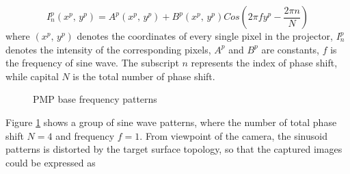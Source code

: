  \begin{equation}
%
I^p_n(x^p, \, y^p) %
= A^p(x^p, \, y^p) + B^p(x^p, \, y^p)Cos(2\pi fy^p - \frac{2\pi n}{N})
%
\end{equation}%
%
where \((x^p, \, y^p)\) denotes the coordinates of every single pixel in the projector, \(I^p_n\) denotes the intensity of the corresponding pixels, \(A^p\) and \(B^p\) are constants, \(f\) is the frequency of sine wave. The subscript \(n\) represents the index of phase shift, while capital \(N\) is the total number of phase shift.\par%
%
%
 \begin{figure}[h]
\hspace*{-2cm} 
{}
\caption{PMP base frequency patterns}
\label{PMPFrequencyPatterns}
\end{figure}%
%
%
%
%
Figure \ref{PMPFrequencyPatterns} shows a group of sine wave patterns, where the number of total phase shift \(N = 4\) and frequency \(f = 1\). From viewpoint of the camera, the sinusoid patterns is distorted by the target surface topology, so that the captured images could be expressed as 

